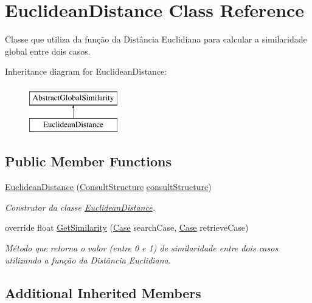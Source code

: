\hypertarget{class_euclidean_distance}{}\section{Euclidean\+Distance Class Reference}
\label{class_euclidean_distance}


Classe que utiliza da função da Distância Euclidiana para calcular a similaridade global entre dois casos.  


Inheritance diagram for Euclidean\+Distance\+:\begin{figure}[H]
\begin{center}
\leavevmode
\includegraphics[height=2.000000cm]{class_euclidean_distance}
\end{center}
\end{figure}
\subsection*{Public Member Functions}
\begin{DoxyCompactItemize}
\item 
\hyperlink{class_euclidean_distance_aaa6a56ca6465502e28906a0c6b89318c}{Euclidean\+Distance} (\hyperlink{class_consult_structure}{Consult\+Structure} \hyperlink{class_abstract_global_similarity_a471ea41af416fd702d48f3b143416e66}{consult\+Structure})
\begin{DoxyCompactList}\small\item\em Construtor da classe \hyperlink{class_euclidean_distance}{Euclidean\+Distance}. \end{DoxyCompactList}\item 
override float \hyperlink{class_euclidean_distance_a1b27b1fd06df3e3defca37187634951e}{Get\+Similarity} (\hyperlink{class_case}{Case} search\+Case, \hyperlink{class_case}{Case} retrieve\+Case)
\begin{DoxyCompactList}\small\item\em Método que retorna o valor (entre 0 e 1) de similaridade entre dois casos utilizando a função da Distância Euclidiana. \end{DoxyCompactList}\end{DoxyCompactItemize}
\subsection*{Additional Inherited Members}


